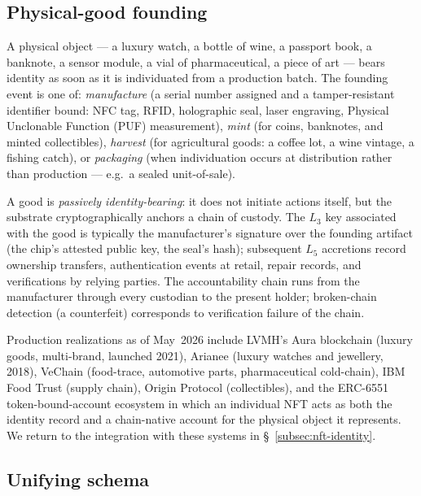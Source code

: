 \documentclass[11pt,a4paper,parskip=half-,DIV=12,headings=standardclasses]{scrartcl}
\theoremstyle{ncthm}
\theoremstyle{ncdef}
\begin{document}
\subsection{Physical-good founding}\label{subsec:good-founding}

A physical object --- a luxury watch, a bottle of wine, a passport
book, a banknote, a sensor module, a vial of pharmaceutical, a piece
of art --- bears identity as soon as it is individuated from a
production batch. The founding event is one of:
\emph{manufacture} (a serial number assigned and a tamper-resistant
identifier bound: NFC tag, RFID, holographic seal, laser engraving,
Physical Unclonable Function (PUF) measurement),
\emph{mint} (for coins, banknotes, and minted collectibles),
\emph{harvest} (for agricultural goods: a coffee lot, a wine vintage,
a fishing catch), or
\emph{packaging} (when individuation occurs at distribution rather
than production --- e.g.\ a sealed unit-of-sale).

A good is \emph{passively identity-bearing}: it does not initiate
actions itself, but the substrate cryptographically anchors a chain of
custody. The $L_3$ key associated with the good is typically the
manufacturer's signature over the founding artifact (the chip's
attested public key, the seal's hash); subsequent $L_5$ accretions
record ownership transfers, authentication events at retail, repair
records, and verifications by relying parties. The accountability
chain runs from the manufacturer through every custodian to the
present holder; broken-chain detection (a counterfeit) corresponds to
verification failure of the chain.

Production realizations as of May~2026 include LVMH's Aura blockchain
(luxury goods, multi-brand, launched 2021), Arianee (luxury watches
and jewellery, 2018), VeChain (food-trace, automotive parts,
pharmaceutical cold-chain), IBM Food Trust (supply chain), Origin
Protocol (collectibles), and the ERC-6551 token-bound-account
ecosystem in which an individual NFT acts as both the identity record
and a chain-native account for the physical object it represents. We
return to the integration with these systems in
 \S~\ref{subsec:nft-identity}.

\subsection{Unifying schema}
\end{document}
